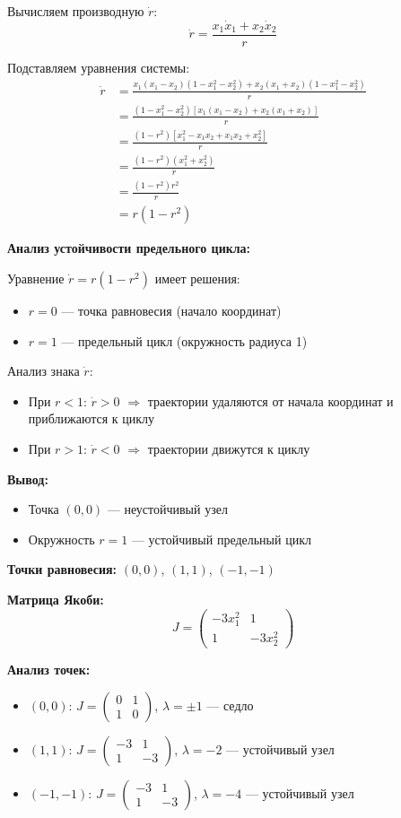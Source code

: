 Вычисляем производную $\dot{r}$:
$$\dot{r} = \frac{x_1\dot{x}_1 + x_2\dot{x}_2}{r}$$

Подставляем уравнения системы:
\begin{align}
\dot{r} &= \frac{x_1(x_1 - x_2)(1 - x_1^2 - x_2^2) + x_2(x_1 + x_2)(1 - x_1^2 - x_2^2)}{r} \\\
&= \frac{(1 - x_1^2 - x_2^2)[x_1(x_1 - x_2) + x_2(x_1 + x_2)]}{r} \\\
&= \frac{(1 - r^2)[x_1^2 - x_1x_2 + x_1x_2 + x_2^2]}{r} \\\
&= \frac{(1 - r^2)(x_1^2 + x_2^2)}{r} \\\
&= \frac{(1 - r^2)r^2}{r} \\\
&= r(1 - r^2)
\end{align}

\textbf{Анализ устойчивости предельного цикла:}

Уравнение $\dot{r} = r(1 - r^2)$ имеет решения:
\begin{itemize}
\item $r = 0$ --- точка равновесия (начало координат)
\item $r = 1$ --- предельный цикл (окружность радиуса 1)
\end{itemize}

Анализ знака $\dot{r}$:
\begin{itemize}
\item При $r < 1$: $\dot{r} > 0$ $\Rightarrow$ траектории удаляются от начала координат и приближаются к циклу
\item При $r > 1$: $\dot{r} < 0$ $\Rightarrow$ траектории движутся к циклу
\end{itemize}

\textbf{Вывод:}
\begin{itemize}
\item Точка $(0,0)$ --- неустойчивый узел
\item Окружность $r = 1$ --- устойчивый предельный цикл
\end{itemize}

\textbf{Точки равновесия:} $(0, 0)$, $(1, 1)$, $(-1, -1)$

\textbf{Матрица Якоби:}
$$J = \begin{pmatrix} -3x_1^2 & 1 \\ 1 & -3x_2^2 \end{pmatrix}$$

\textbf{Анализ точек:}
\begin{itemize}
\item $(0, 0)$: $J = \begin{pmatrix} 0 & 1 \\ 1 & 0 \end{pmatrix}$, $\lambda = \pm 1$ --- седло
\item $(1, 1)$: $J = \begin{pmatrix} -3 & 1 \\ 1 & -3 \end{pmatrix}$, $\lambda = -2$ --- устойчивый узел
\item $(-1, -1)$: $J = \begin{pmatrix} -3 & 1 \\ 1 & -3 \end{pmatrix}$, $\lambda = -4$ --- устойчивый узел
\end{itemize}

